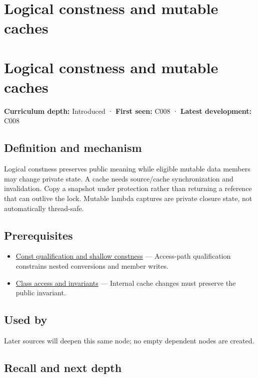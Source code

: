 \hypertarget{appendix-f5593256bcaf}{}
\section*{Logical constness and mutable caches}
\section{Logical constness and mutable caches}\label{appendix-f5593256bcaf-logical-constness-and-mutable-caches}

\textbf{Curriculum depth:} Introduced · \textbf{First seen:} C008 · \textbf{Latest development:} C008

\subsection{Definition and mechanism}\label{appendix-f5593256bcaf-definition-and-mechanism}

Logical constness preserves public meaning while eligible mutable data members may change private state. A cache needs source/cache synchronization and invalidation. Copy a snapshot under protection rather than returning a reference that can outlive the lock. Mutable lambda captures are private closure state, not automatically thread-safe.

\subsection{Prerequisites}\label{appendix-f5593256bcaf-prerequisites}

\begin{itemize}
\tightlist
\item
  \hyperref[appendix-c25d60fed375]{Const qualification and shallow constness} --- Access-path qualification constrains nested conversions and member writes.
\item
  \hyperref[appendix-8e5214819615]{Class access and invariants} --- Internal cache changes must preserve the public invariant.
\end{itemize}

\subsection{Used by}\label{appendix-f5593256bcaf-used-by}

Later sources will deepen this same node; no empty dependent nodes are created.

\subsection{Recall and next depth}\label{appendix-f5593256bcaf-recall-and-next-depth}

